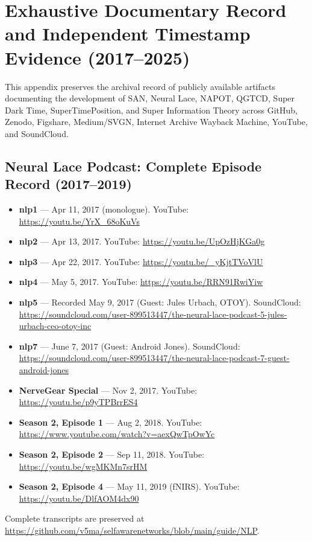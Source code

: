 \documentclass[american,11pt,letterpaper]{article}
\begin{document}
\section{Exhaustive Documentary Record and Independent Timestamp Evidence (2017--2025)}
\label{app:documentary-record}

This appendix preserves the archival record of publicly available artifacts documenting the development of SAN, Neural Lace, NAPOT, QGTCD, Super Dark Time, SuperTimePosition, and Super Information Theory across GitHub, Zenodo, Figshare, Medium/SVGN, Internet Archive Wayback Machine, YouTube, and SoundCloud.

\subsection{Neural Lace Podcast: Complete Episode Record (2017--2019)}
\begin{itemize}
  \item \textbf{nlp1} --- Apr 11, 2017 (monologue). YouTube: \url{https://youtu.be/YrX_68oKuVs}
  \item \textbf{nlp2} --- Apr 13, 2017. YouTube: \url{https://youtu.be/UpOzHjKGa0g}
  \item \textbf{nlp3} --- Apr 22, 2017. YouTube: \url{https://youtu.be/_yKjtTVoVlU}
  \item \textbf{nlp4} --- May 5, 2017. YouTube: \url{https://youtu.be/RRN91RwiYiw}
  \item \textbf{nlp5} --- Recorded May 9, 2017 (Guest: Jules Urbach, OTOY). SoundCloud: \url{https://soundcloud.com/user-899513447/the-neural-lace-podcast-5-jules-urbach-ceo-otoy-inc}
  \item \textbf{nlp7} --- June 7, 2017 (Guest: Android Jones). SoundCloud: \url{https://soundcloud.com/user-899513447/the-neural-lace-podcast-7-guest-android-jones}
  \item \textbf{NerveGear Special} --- Nov 2, 2017. YouTube: \url{https://youtu.be/p9yTPBrrES4}
  \item \textbf{Season 2, Episode 1} --- Aug 2, 2018. YouTube: \url{https://www.youtube.com/watch?v=aexQwTpOwYc}
  \item \textbf{Season 2, Episode 2} --- Sep 11, 2018. YouTube: \url{https://youtu.be/wgMKMn7srHM}
  \item \textbf{Season 2, Episode 4} --- May 11, 2019 (fNIRS). YouTube: \url{https://youtu.be/DlfAOM4dx90}
\end{itemize}
Complete transcripts are preserved at \url{https://github.com/v5ma/selfawarenetworks/blob/main/guide/NLP}.
\end{document}
